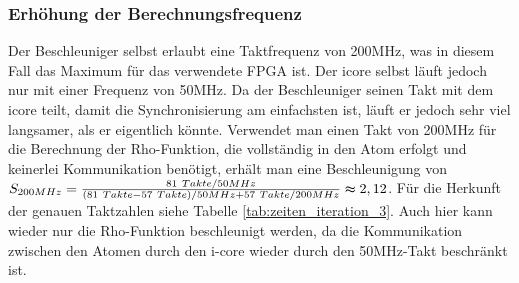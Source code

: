 \subsubsection{Erhöhung der Berechnungsfrequenz}
Der Beschleuniger selbst erlaubt eine Taktfrequenz von 200MHz, was in diesem Fall das Maximum für das verwendete FPGA ist. Der icore selbst
läuft jedoch nur mit einer Frequenz von 50MHz. Da der Beschleuniger seinen Takt mit dem icore teilt, damit die Synchronisierung am einfachsten ist,
läuft er jedoch sehr viel langsamer, als er eigentlich könnte. Verwendet man einen Takt von 200MHz
für die Berechnung der Rho-Funktion, die vollständig in den Atom erfolgt und keinerlei Kommunikation benötigt, erhält man eine Beschleunigung von
$S_{200MHz} = \frac{81\ Takte / 50MHz}{(81\ Takte - 57\ Takte) / 50MHz + 57\ Takte / 200MHz} \thickapprox 2,12$.
Für die Herkunft der genauen Taktzahlen siehe Tabelle \ref{tab:zeiten_iteration_3}. Auch hier kann wieder nur die Rho-Funktion beschleunigt werden,
da die Kommunikation zwischen den Atomen durch den i-core wieder durch den 50MHz-Takt beschränkt ist.


